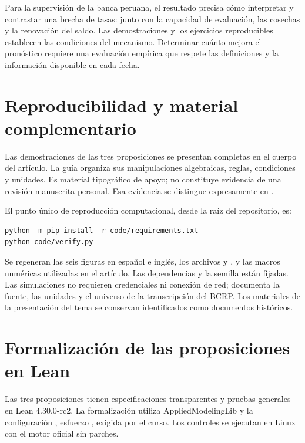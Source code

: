 \documentclass[11pt]{article}
\theoremstyle{definition}\newtheorem{assumption}{Supuesto}
\begin{document}
Para la supervisión de la banca peruana, el resultado precisa cómo interpretar
y contrastar una brecha de tasas: junto con la capacidad de evaluación, las
cosechas y la renovación del saldo. Las demostraciones y los ejercicios
reproducibles establecen las condiciones del mecanismo. Determinar cuánto
mejora el pronóstico requiere una evaluación empírica que respete las
definiciones y la información disponible en cada fecha.\label{body:end}
\clearpage

\clearpage\appendix

\section{Reproducibilidad y material complementario}
Las demostraciones de las tres proposiciones se presentan completas en el
cuerpo del artículo. La guía  organiza sus
manipulaciones algebraicas, reglas, condiciones y unidades. Es material
tipográfico de apoyo; no constituye evidencia de una revisión manuscrita
personal. Esa evidencia se distingue expresamente en .

El punto único de reproducción computacional, desde la raíz del repositorio, es:
\begin{verbatim}
python -m pip install -r code/requirements.txt
python code/verify.py
\end{verbatim}
Se regeneran las seis figuras en español e inglés, los archivos
 y , y las macros
numéricas utilizadas en el artículo. Las dependencias y la semilla están
fijadas. Las simulaciones no requieren credenciales ni conexión de red;
 documenta la fuente, las unidades y el universo
de la transcripción del BCRP. Los materiales de la presentación del tema se
conservan identificados como documentos históricos.

\section{Formalización de las proposiciones en Lean}\label{app:lean}
Las tres proposiciones tienen especificaciones transparentes y pruebas
generales en Lean 4.30.0-rc2. La formalización utiliza AppliedModelingLib y
la configuración , esfuerzo , exigida por el
curso. Los controles se ejecutan en Linux con el motor oficial sin parches.
\end{document}

